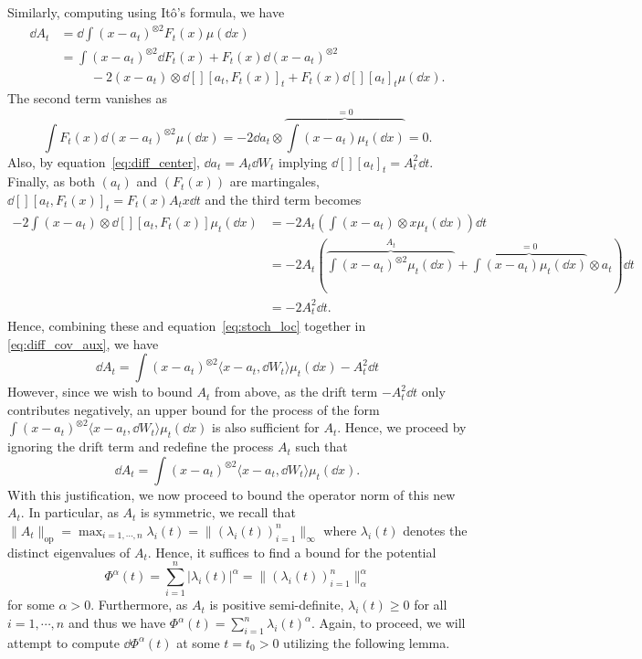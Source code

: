 Similarly, computing using Itô's formula, we have
\begin{equation}\label{eq:diff_cov_aux}
  \begin{split}
    \dd A_t & = \dd \int (x - a_t)^{\otimes 2} F_t(x) \mu(\dd x)\\
      & = \int (x - a_t)^{\otimes 2} \dd F_t(x) + F_t(x) \dd (x - a_t)^{\otimes 2}\\
      & \hspace{1cm} - 2 (x - a_t) \otimes \dd[][a_t, F_t(x)]_t +F_t(x)\dd[][a_t]_t\mu(\dd x).
  \end{split}
\end{equation}
The second term vanishes as 
\[\int F_t(x) \dd (x - a_t)^{\otimes 2} \mu(\dd x) = -2 \dd a_t \otimes 
  \overbrace{\int (x - a_t) \mu_t(\dd x)}^{= 0} = 0.\]
Also, by equation~\eqref{eq:diff_center}, \(\dd a_t = A_t \dd W_t\) implying \(\dd[][a_t]_t = A_t^2 \dd t\).
Finally, as both \((a_t)\) and \((F_t(x))\) are martingales, \(\dd[] [a_t, F_t(x)]_t = F_t(x) A_t x \dd t\) 
and the third term becomes
\begin{align*}
  -2 \int (x - a_t) \otimes \dd[] [a_t, F_t(x)] \mu_t(\dd x) 
  & = - 2A_t \left(\int (x - a_t) \otimes x \mu_t(\dd x)\right) \dd t \\
  & = -2 A_t \left(\overbrace{\int (x - a_t)^{\otimes 2} \mu_t(\dd x)}^{A_t} + 
    \overbrace{\int (x - a_t) \mu_t(\dd x)}^{= 0} \otimes a_t \right) \dd t\\ 
  & = -2 A_t^2 \dd t.
\end{align*}
Hence, combining these and equation~\eqref{eq:stoch_loc} together in \eqref{eq:diff_cov_aux}, we have
\[\dd A_t = \int (x - a_t)^{\otimes 2} \langle x - a_t, \dd W_t \rangle \mu_t(\dd x) - A_t^2 \dd t\]
However, since we wish to bound \(A_t\) from above, as the drift term \(- A_t^2 \dd t\) only contributes 
negatively, an upper bound for the process of the form 
\(\int (x - a_t)^{\otimes 2} \langle x - a_t, \dd W_t \rangle \mu_t(\dd x)\) is also sufficient for \(A_t\).
Hence, we proceed by ignoring the drift term and redefine the process \(A_t\) such that
\begin{equation}\label{eq:diff_cov}
  \dd A_t = \int (x - a_t)^{\otimes 2} \langle x - a_t, \dd W_t \rangle \mu_t(\dd x).
\end{equation}
With this justification, we now proceed to bound the operator norm of this new \(A_t\). In particular, 
as \(A_t\) is symmetric, we recall that \(\|A_t\|_{\text{op}} = \max_{i= 1, \cdots, n} \lambda_i(t) = \|(\lambda_i(t))_{i = 1}^n\|_\infty\) 
where \(\lambda_i(t)\) denotes the distinct eigenvalues of \(A_t\). Hence, it suffices to find a bound for the potential 
\begin{equation}
  \Phi^{\alpha}(t) = \sum_{i = 1}^n |\lambda_i(t)|^{\alpha} = \|(\lambda_i(t))_{i = 1}^n\|_\alpha^\alpha
\end{equation} 
for some \(\alpha > 0\). Furthermore, as \(A_t\) is positive 
semi-definite, \(\lambda_i(t) \ge 0\) for all \(i = 1, \cdots, n\) and thus we have
\(\Phi^\alpha(t) = \sum_{i = 1}^n \lambda_i(t)^{\alpha}\). Again, to proceed, we will attempt to compute 
\(\dd \Phi^\alpha(t)\) at some \(t = t_0 > 0\) utilizing the following lemma.

